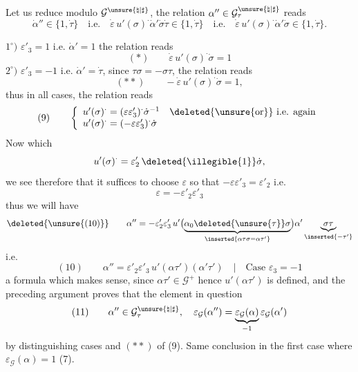 
Let us reduce modulo $\mathcal{G}^{\unsure{\natural|\sharp}}$,
the relation $\alpha''\in\mathcal{G}^{\unsure{\natural|\sharp}}_\tau$
reads
\[
\dot{\alpha}''\in\{1,\dot{\tau}\}\quad\text{i.e.}\quad
\dot{\varepsilon}\,u'(\sigma)^{\cdot}\dot{\alpha}'\dot{\sigma}\dot{\tau}
\in\{1,\dot{\tau}\}
\quad\text{i.e.}\quad
\dot{\varepsilon}\,u'(\sigma)^{\cdot}\dot{\alpha}'\dot{\sigma}
\in\{1,\dot{\tau}\}.
\]

$1^\circ)$ \quad $\varepsilon'_3=1$ i.e. $\dot{\alpha}'=1$
the relation reads
\[
(*)\qquad \dot{\varepsilon}\,u'(\sigma)^{\cdot}\dot{\sigma}=1
\]
$2^\circ)$ \quad $\varepsilon'_3=-1$ i.e. $\dot{\alpha}'=\dot{\tau}$,
since $\tau\sigma=-\sigma\tau$, the relation reads
\[
(**)\qquad -\dot{\varepsilon}\,u'(\sigma)^{\cdot}\dot{\sigma}=1,
\]
thus in all cases, the relation reads
\[
(9)\qquad
\left\{
\begin{array}{l}
u'(\sigma)^{\cdot}=(\varepsilon\varepsilon'_3)^{\cdot}
\dot{\sigma}^{-1}
\quad\deleted{\unsure{\text{or}}}\ \text{i.e. again}\\
u'(\sigma)^{\cdot}=(-\varepsilon\varepsilon'_3)^{\cdot}\dot{\sigma}
\end{array}
\right.
\]
Now 
which 
\[
u'(\sigma)^{\cdot}
=\varepsilon'_2\,\deleted{\text{\illegible{1}}}\dot{\sigma},
\]
we see therefore that it suffices to choose $\varepsilon$ so that
$-\varepsilon\varepsilon'_3=\varepsilon'_2$
i.e.
\[
\varepsilon=-\varepsilon'_2\varepsilon'_3
\]
thus we will have
\[
\deleted{\unsure{(10)}}\qquad
\alpha''=-\varepsilon'_2\varepsilon'_3\,
u'\bigl(
\underbrace{\alpha_0\deleted{\unsure{\tau}}\sigma}
_{\inserted{\alpha\tau\sigma=\alpha\tau'}}
\bigr)\alpha'\underbrace{\sigma\tau}_{\inserted{-\tau'}}
\]
i.e.
\[
(10)\qquad
\alpha''=\varepsilon'_2\varepsilon'_3\,u'(\alpha\tau')
(\alpha'\tau')
\quad\big|\quad\text{Case }\varepsilon_3=-1
\]
a formula which makes sense, since $\alpha\tau'\in\mathcal{G}^{+}$ hence
$u'(\alpha\tau')$ is defined, and the preceding argument proves that
the element in question 
\[
(11)\qquad
\alpha''\in\mathcal{G}^{\unsure{\natural|\sharp}}_\tau,\quad
\varepsilon_{\mathcal{G}}(\alpha'')
=\underbrace{\varepsilon_{\mathcal{G}}(\alpha)}_{-1}
\varepsilon_{\mathcal{G}}(\alpha')
\]
by distinguishing cases \unsure{(*)} and $(**)$ of (9).
Same conclusion in the first case where
$\varepsilon_{\mathcal{G}}(\alpha)=1$ (7).

